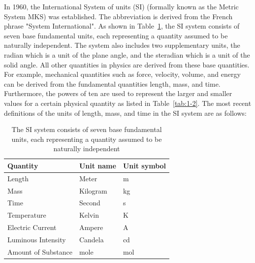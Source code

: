 \documentclass[10pt]{article}
\numberwithin{equation}{section}
\begin{document}
In 1960, the International System of units (SI) (formally known as the Metric System MKS) was established. The abbreviation is derived from the French phrase "System International". As shown in Table~\ref{tab:1-1}, the SI system consists of seven base fundamental units, each representing a quantity assumed to be naturally independent. The system also includes two supplementary units, the radian which is a unit of the plane angle, and the steradian which is a unit of the solid angle. All other quantities in physics are derived from these base quantities. For example, mechanical quantities such as force, velocity, volume, and energy can be derived from the fundamental quantities length, mass, and time. Furthermore, the powers of ten are used to represent the larger and smaller values for a certain physical quantity as listed in Table~\ref{tab:1-2}. The most recent definitions of the units of length, mass, and time in the SI system are as follows:

\begin{table}[htbp]
\centering
\begin{tabular}{l|l|l}
\hline
Quantity & Unit name & Unit symbol \\
\hline
Length & Meter & m \\
\hline
Mass & Kilogram & kg \\
\hline
Time & Second & s \\
\hline
Temperature & Kelvin & K \\
\hline
Electric Current & Ampere & A \\
\hline
Luminous Intensity & Candela & cd \\
\hline
Amount of Substance & mole & mol \\
\hline
\end{tabular}
\caption{The SI system consists of seven base fundamental units, each representing a quantity assumed to be naturally independent}\label{tab:1-1}
\end{table}
\end{document}
